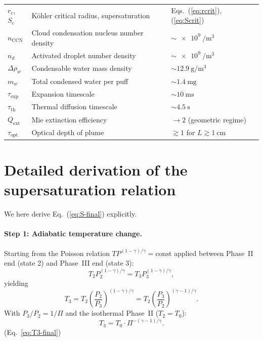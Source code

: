 \documentclass[11pt,a4paper]{article}
\theoremstyle{definition}
\theoremstyle{plain}
\begin{document}
\begin{tabular}{@{}lll@{}}
$r_c$, $S_c$ & Köhler critical radius, supersaturation & Eqs.~(\ref{eq:rcrit}), (\ref{eq:Scrit}) \\
$n_{\text{CCN}}$ & Cloud condensation nucleus number density & $\sim\SI{e9}{\per\cubic\meter}$ \\
$n_d$ & Activated droplet number density & $\sim\SI{e9}{\per\cubic\meter}$ \\
$\Delta\rho_w$ & Condensable water mass density & $\sim\SI{12.9}{\gram\per\cubic\meter}$ \\
$m_w$ & Total condensed water per puff & $\sim\SI{1.4}{\milli\gram}$ \\
$\tau_{\text{exp}}$ & Expansion timescale & $\sim\SI{10}{\milli\second}$ \\
$\tau_{\text{th}}$ & Thermal diffusion timescale & $\sim\SI{4.5}{\second}$ \\
$Q_{\text{ext}}$ & Mie extinction efficiency & $\to 2$ (geometric regime) \\
$\tau_{\text{opt}}$ & Optical depth of plume & $\gtrsim 1$ for $L \gtrsim \SI{1}{\centi\meter}$ \\
\bottomrule
\end{tabular}

\section{Detailed derivation of the supersaturation relation}
\label{app:derivation}

We here derive Eq.~(\ref{eq:S-final}) explicitly.

\paragraph{Step 1: Adiabatic temperature change.}
Starting from the Poisson relation $TP^{(1-\gamma)/\gamma} = \text{const}$ applied between Phase~II end (state 2) and Phase~III end (state 3):
\begin{equation*}
T_2 P_2^{(1-\gamma)/\gamma} = T_3 P_3^{(1-\gamma)/\gamma},
\end{equation*}
yielding
\begin{equation*}
T_3 = T_2 \left(\frac{P_2}{P_3}\right)^{(1-\gamma)/\gamma} = T_2 \left(\frac{P_3}{P_2}\right)^{(\gamma-1)/\gamma}.
\end{equation*}
With $P_3/P_2 = 1/\Pi$ and the isothermal Phase~II ($T_2 = T_0$):
\begin{equation*}
T_3 = T_0 \cdot \Pi^{-(\gamma-1)/\gamma}.
\end{equation*}
\hfill (Eq.~\ref{eq:T3-final})
\end{document}
